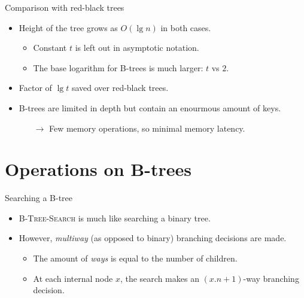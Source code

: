\documentclass[11pt,t]{beamer}
\begin{document}
	\begin{frame}{Comparison with red-black trees}
		\begin{itemize}[<+->]
			\item Height of the tree grows as \(O(\lg n)\) in both cases.
			\begin{itemize}[<+->]
				\item Constant \(t\) is left out in asymptotic notation.
				\item The base logarithm for B-trees is much larger: \(t\) vs \(2\).
			\end{itemize}
			\item Factor of \(\lg t\) saved over red-black trees.
			\item B-trees are limited in depth but contain an enourmous amount of keys.
			\begin{itemize}
				\item[\(\rightarrow\)] Few memory operations, so minimal memory latency.
			\end{itemize}
		\end{itemize}
	\end{frame}

	\section{Operations on B-trees}

	\begin{frame}{Searching a B-tree}
		\begin{itemize}[<+->]
			\item \textsc{B-Tree-Search} is much like searching a binary tree.
			\item However, \textit{multiway} (as opposed to binary) branching decisions are made.
			\begin{itemize}[<+->]
				\item The amount of \textit{ways} is equal to the number of children.
				\item At each internal node \(x\), the search makes an \((x.n+1)\)-way branching decision.
			\end{itemize}
		\end{itemize}
	\end{frame}
\end{document}
